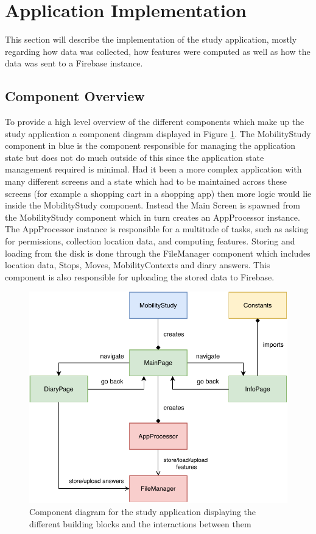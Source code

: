 \section{Application Implementation}
This section will describe the implementation of the study application, mostly regarding how data was collected, how features were computed as well as how the data was sent to a Firebase instance. 

\subsection{Component Overview}
To provide a high level overview of the different components which make up the study application a component diagram displayed in Figure \ref{fig:app-component-diagram}. The MobilityStudy component in blue is the component responsible for managing the application state but does not do much outside of this since the application state management required is minimal. Had it been a more complex application with many different screens and a state which had to be maintained across these screens (for example a shopping cart in a shopping app) then more logic would lie inside the MobilityStudy component. Instead the Main Screen is spawned from the MobilityStudy component which in turn creates an AppProcessor instance. The AppProcessor instance is responsible for a multitude of tasks, such as asking for permissions, collection location data, and computing features. Storing and loading from the disk is done through the FileManager component which includes location data, Stops, Moves, MobilityContexts and diary answers. This component is also responsible for uploading the stored data to Firebase.

\begin{figure}
    \centering
    \includegraphics[width=\textwidth]{images/diagrams/app-diagram.pdf}
    \caption{Component diagram for the study application displaying the different building blocks and the interactions between them}
    \label{fig:app-component-diagram}
\end{figure}



